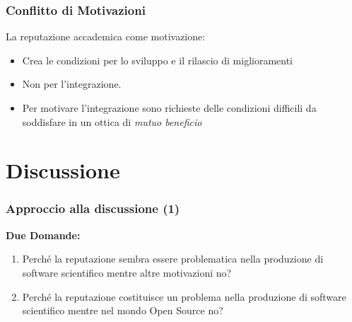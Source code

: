 \begin{frame}\frametitle{Conflitto di Motivazioni}

La reputazione accademica come \alert{motivazione}:

\begin{itemize}[<+->]
\itemsep1pt\parskip0pt
\item
  Crea le condizioni per lo sviluppo e il rilascio di miglioramenti
\item
  Non per l'integrazione.
\item
  Per motivare l'integrazione sono richieste delle condizioni
  \alert{difficili} da soddisfare in un ottica di
  \alert{\em{mutuo beneficio}}
\end{itemize}


\end{frame}

\section{Discussione}

\begin{frame}\frametitle{Approccio alla discussione (1)}

\textbf{Due Domande:}

\begin{enumerate}[<+->]
\def\labelenumi{\arabic{enumi}.}
\item
  Perché la reputazione sembra essere problematica nella produzione di
  software scientifico mentre altre motivazioni no?
\item
  Perché la reputazione costituisce un problema nella produzione di
  software scientifico mentre nel mondo Open Source no?
\end{enumerate}

\end{frame}

